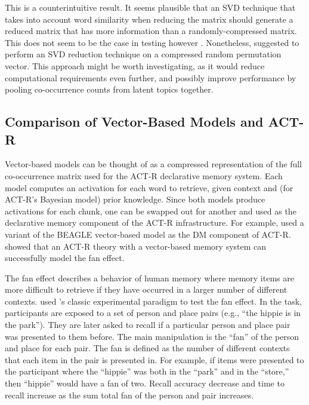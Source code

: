 \documentclass[man,floatsintext,donotrepeattitle]{apa6}
\begin{document}
This is a counterintuitive result.
It seems plausible that an SVD technique that takes into account word similarity when reducing the matrix should generate a reduced matrix that has more information than a randomly-compressed matrix.
This does not seem to be the case in testing however \parencites{Sahlgren2008,Jones2007}.
Nonetheless, \textcite{Kanerva2000} suggested to perform an SVD reduction technique on a compressed random permutation vector.
This approach might be worth investigating, as it would reduce computational requirements even further, and possibly improve performance by pooling co-occurrence counts from latent topics together.

\subsection{Comparison of Vector-Based Models and ACT-R}

Vector-based models can be thought of as a compressed representation of the full co-occurrence matrix used for the ACT-R declarative memory system.
Each model computes an activation for each word to retrieve, given context and (for ACT-R's Bayesian model) prior knowledge.
Since both models produce activations for each chunk, one can be swapped out for another and used as the declarative memory component of the ACT-R infrastructure.
For example, \textcite{Rutledge2007} used a variant of the BEAGLE vector-based model as the DM component of ACT-R.
 showed that an ACT-R theory with a vector-based memory system can successfully model the fan effect.

The fan effect describes a behavior of human memory where memory items are more difficult to retrieve if they have occurred in a larger number of different contexts.
\textcite{Rutledge2008} used \textcite{Anderson1974}'s classic experimental paradigm to test the fan effect.
In the task, participants are exposed to a set of person and place pairs (e.g., ``the hippie is in the park'').
They are later asked to recall if a particular person and place pair was presented to them before.
The main manipulation is the ``fan'' of the person and place for each pair.
The fan is defined as the number of different contexts that each item in the pair is presented in.
For example, if items were presented to the participant where the ``hippie'' was both in the ``park'' and in the ``store,'' then ``hippie'' would have a fan of two.
Recall accuracy decrease and time to recall increase as the sum total fan of the person and pair increases.
\end{document}

